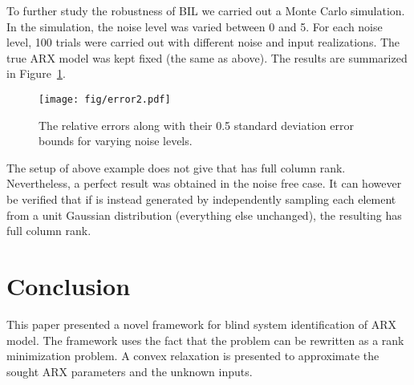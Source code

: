 \documentclass{ifacconf}
\newcommand{\0}{{\bf 0}}
\begin{document}
To further study the robustness of BIL we carried out a Monte Carlo
simulation. In the simulation, the noise level  was varied
between 0 and 5. For each noise level, 100 trials were carried out
with different noise and input realizations. The true ARX model was
kept fixed (the same as above). The results are summarized in
Figure~\ref{fig:error2}. 

\begin{figure}
 \texttt{[image: fig/error2.pdf]}
\caption{The relative errors along with their 0.5 standard deviation
  error bounds for varying noise levels.}
\label{fig:error2}
 \end{figure}

The setup of above example does not give that  has full
column rank. Nevertheless, a perfect result was obtained in the noise free
case.  It can however be verified that if   is instead generated by
independently sampling each element from a unit Gaussian distribution
(everything else unchanged),
the resulting  has full column rank.






\section{Conclusion}
This paper presented a novel framework for blind system identification
of ARX model. The framework uses the fact that the problem can be
rewritten as a rank minimization problem. A convex relaxation is
presented to approximate the sought ARX parameters and the unknown
inputs.  


\end{document}
